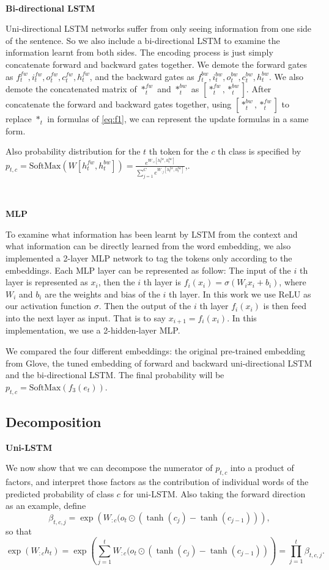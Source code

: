 \documentclass{article}
\begin{document}
\ 

\textbf{Bi-directional LSTM}

Uni-directional LSTM networks suffer from only seeing information from one side of the sentence. So we also include a bi-directional LSTM to examine the information learnt from both sides. The encoding process is just simply concatenate forward and backward gates together. We demote the forward gates as $f_t^{fw}, i_t^{fw}, o_t^{fw}, c_t^{fw}, h_t^{fw}$, and the backward gates as $f_t^{bw}, i_t^{bw}, o_t^{bw}, c_t^{bw}, h_t^{bw}$. We also demote the concatenated matrix of $*_t^{fw}$ and $*_t^{bw}$ as $[*_t^{fw}, *_t^{bw}]$. After concatenate the forward and backward gates together, using $[*_t^{bw}, *_t^{fw}]$ to replace $*_t$ in formulas of \ref{eq:f1}, we can represent the update formulas in a same form. 

Also probability distribution for the $t$ th token for the $c$ th class is specified by $p_{t, c} = \text{SoftMax}(W [h_t^{fw}, h_t^{bw}]) = \frac{e^{W_{:c} [h_t^{fw}, h_t^{bw}]}}{\sum_{j = 1} ^ C e^{W_{:j} [h_t^{fw}, h_t^{bw}]}}$,.

\ 

\textbf{MLP}

To examine what information has been learnt by LSTM from the context and what information can be directly learned from the word embedding, we also implemented a 2-layer MLP network to tag the tokens only according to the embeddings. Each MLP layer can be represented as follow:
The input of the $i$ th layer is represented as $x_i$, then the $i$ th layer is $f_i(x_i) = \sigma(W_i x_i + b_i)$, where $W_i$ and $b_i$ are the weights and bias of the $i$ th layer. In this work we use ReLU as our activation function $\sigma$. Then the output of the $i$ th layer $f_i(x_i)$ is then feed into the next layer as input. That is to say $x_{i+1} = f_i(x_i)$. In this implementation, we use a 2-hidden-layer MLP.

We compared the four different embeddings: the original pre-trained embedding from Glove, the tuned embedding of forward and backward uni-directional LSTM and the bi-directional LSTM. The final probability will be $p_{t, c} = \text{SoftMax}(f_3(e_t))$.%

\subsection{Decomposition}

\textbf{Uni-LSTM}

We now show that we can decompose the numerator of $p_{t, c}$ into a product of factors, and interpret those factors as the contribution of individual words of the predicted probability of class $c$ for uni-LSTM. Also taking the forward direction as an example, define 
\begin{equation}\label{eq:uni-beta} 
\beta_{t, c, j} = \exp\left(W_{:c} (o_t \odot (\tanh(c_j)- \tanh(c_{j-1}))\right),
\end{equation}
so that 
\[\exp( W_{:c} h_t) = \exp\left(\sum_{j=1}^t W_{:c} (o_t \odot (\tanh(c_j) - \tanh(c_{j-1}))\right) = \prod_{j=1}^t \beta_{t, c, j}.\]
\end{document}
